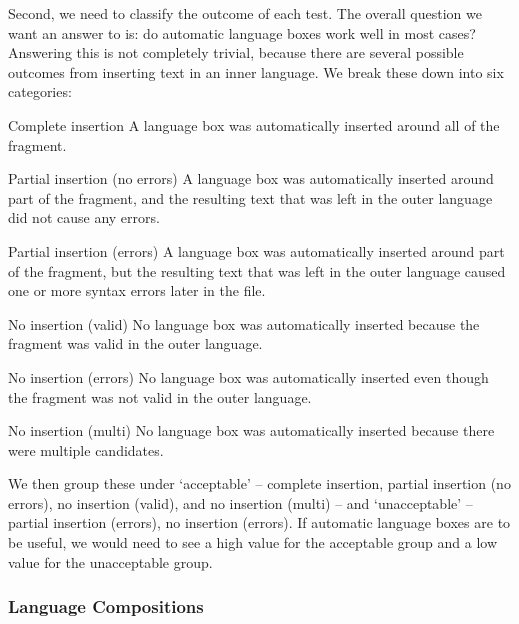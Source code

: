 \documentclass[sigplan,screen]{acmart}
\begin{document}
Second, we need to classify the outcome of each test. The overall question we
want an answer to is: do automatic language boxes work well in most
cases? Answering this is not completely trivial, because there are several
possible outcomes from inserting text in an inner language. We
break these down into six categories: \label{detailed categories}

\begin{description*}
  \item[Complete insertion] A language box was automatically inserted around
    all of the fragment.
  \item[Partial insertion (no errors)] A language box was automatically
    inserted around part of the fragment, and the resulting text that was left
    in the outer language did not cause any errors.
  \item[Partial insertion (errors)] A language box was automatically inserted
    around part of the fragment, but the resulting text that was left
    in the outer language caused one or more syntax errors later in the file.
  \item[No insertion (valid)] No language box was automatically inserted because
    the fragment was valid in the outer language.
  \item[No insertion (errors)] No language box was automatically inserted even
    though the fragment was not valid in the outer language.
  \item[No insertion (multi)] No language box was automatically inserted because
    there were multiple candidates.
\end{description*}

We then group these under `acceptable' -- complete insertion, partial insertion
(no errors), no insertion (valid), and no insertion (multi) -- and
`unacceptable' -- partial insertion (errors), no insertion (errors).
If automatic language boxes are to be useful, we would need to see a high value
for the acceptable group and a low value for the unacceptable group.


\subsubsection{Language Compositions}
\end{document}
